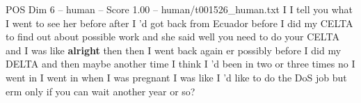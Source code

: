 \begin{textsample}{POS Dim 6 – human – Score 1.00 – human/t001526\_human.txt}  \label{ex:f6_pos_012}
I I tell you what I went to see her before after I 'd got back from Ecuador before I did my CELTA to find out about possible work and she said well you need to do your CELTA and I was like \textbf{alright} then then I went back again er possibly before I did my DELTA and then maybe another time I think I 'd been in two or three times no I went in I went in when I was pregnant I was like I 'd like to do the DoS job but erm only if you can wait another year or so?

\end{textsample}
